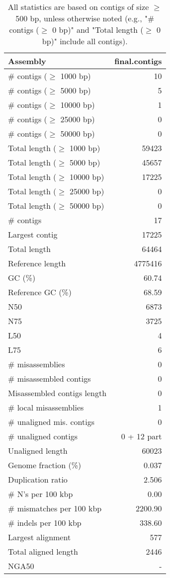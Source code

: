 \documentclass[12pt,a4paper]{article}
\begin{document}
\begin{table}[ht]
\begin{center}
\caption{All statistics are based on contigs of size $\geq$ 500 bp, unless otherwise noted (e.g., "\# contigs ($\geq$ 0 bp)" and "Total length ($\geq$ 0 bp)" include all contigs).}
\begin{tabular}{|l*{1}{|r}|}
\hline
Assembly & final.contigs \\ \hline
\# contigs ($\geq$ 1000 bp) & 10 \\ \hline
\# contigs ($\geq$ 5000 bp) & 5 \\ \hline
\# contigs ($\geq$ 10000 bp) & 1 \\ \hline
\# contigs ($\geq$ 25000 bp) & 0 \\ \hline
\# contigs ($\geq$ 50000 bp) & 0 \\ \hline
Total length ($\geq$ 1000 bp) & 59423 \\ \hline
Total length ($\geq$ 5000 bp) & 45657 \\ \hline
Total length ($\geq$ 10000 bp) & 17225 \\ \hline
Total length ($\geq$ 25000 bp) & 0 \\ \hline
Total length ($\geq$ 50000 bp) & 0 \\ \hline
\# contigs & 17 \\ \hline
Largest contig & 17225 \\ \hline
Total length & 64464 \\ \hline
Reference length & 4775416 \\ \hline
GC (\%) & 60.74 \\ \hline
Reference GC (\%) & 68.59 \\ \hline
N50 & 6873 \\ \hline
N75 & 3725 \\ \hline
L50 & 4 \\ \hline
L75 & 6 \\ \hline
\# misassemblies & 0 \\ \hline
\# misassembled contigs & 0 \\ \hline
Misassembled contigs length & 0 \\ \hline
\# local misassemblies & 1 \\ \hline
\# unaligned mis. contigs & 0 \\ \hline
\# unaligned contigs & 0 + 12 part \\ \hline
Unaligned length & 60023 \\ \hline
Genome fraction (\%) & 0.037 \\ \hline
Duplication ratio & 2.506 \\ \hline
\# N's per 100 kbp & 0.00 \\ \hline
\# mismatches per 100 kbp & 2200.90 \\ \hline
\# indels per 100 kbp & 338.60 \\ \hline
Largest alignment & 577 \\ \hline
Total aligned length & 2446 \\ \hline
NGA50 & - \\ \hline
\end{tabular}
\end{center}
\end{table}
\end{document}
